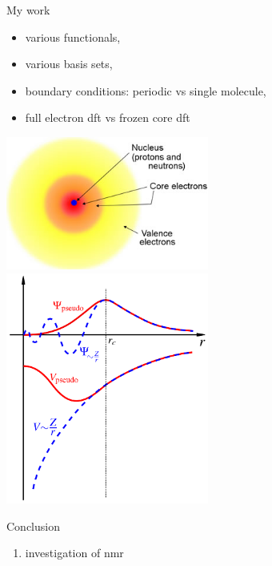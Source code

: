 \documentclass[slovene, usenames,dvipsnames]{beamer}
\begin{document}
      \begin{frame}{My work}
        \begin{minipage}[]{0.5\textwidth}
          \begin{itemize}
          \item various functionals,
          \item various basis sets,
          \item boundary conditions: periodic vs single molecule,
          \item full electron dft vs frozen core dft
          \end{itemize}
        \end{minipage}%
        \begin{minipage}[]{0.5\textwidth}
           \includegraphics[width=0.5\textwidth]{valence_core_electrons.jpg}
           \includegraphics[width=0.5\textwidth]{pseudopotential.png}
          
        \end{minipage}
      \end{frame}
      
    \begin{frame}{Conclusion}
      \begin{enumerate}
        \item investigation of nmr
      \end{enumerate}
    \end{frame}
\end{document}
